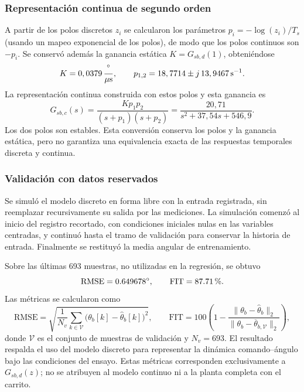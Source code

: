 \documentclass[a4paper, twoside, 10pt, spanish]{article}
\numberwithin{table}{section}
\begin{document}
    \subsubsection{Representación continua de segundo orden}
    A partir de los polos discretos $z_i$ se calcularon los parámetros $p_i=-\log(z_i)/T_s$ (usando un mapeo exponencial de los polos), de modo que los polos continuos son $-p_i$. Se conservó además la ganancia estática $K=G_{sb,d}(1)$, obteniéndose
    \[
        K=0,0379\,\frac{\degree}{\mu\text{s}},\qquad
        p_{1,2}=18,7714 \pm j\,13,9467\,\text{s}^{-1}.
    \]
    La representación continua construida con estos polos y esta ganancia es
    \begin{equation}
        G_{sb,c}(s)=\frac{Kp_1p_2}{(s+p_1)(s+p_2)}
        =\frac{20,71}{s^2+37,54s+546,9}.
        \label{eq:servo_continuo_identificado}
    \end{equation}
    Los dos polos son estables. Esta conversión conserva los polos y la ganancia estática, pero no garantiza una equivalencia exacta de las respuestas temporales discreta y continua.

    \subsubsection{Validación con datos reservados}
    Se simuló el modelo discreto en forma libre con la entrada registrada, sin reemplazar recursivamente su salida por las mediciones. La simulación comenzó al inicio del registro recortado, con condiciones iniciales nulas en las variables centradas, y continuó hasta el tramo de validación para conservar la historia de entrada. Finalmente se restituyó la media angular de entrenamiento.

    Sobre las últimas 693 muestras, no utilizadas en la regresión, se obtuvo
    \[
        \mathrm{RMSE}=0.649678\degree,\qquad \mathrm{FIT}=87.71\,\%.
    \]
    Las métricas se calcularon como
    \[
        \mathrm{RMSE}=\sqrt{\frac{1}{N_v}\sum_{k\in\mathcal V}
        \bigl(\theta_b[k]-\widehat\theta_b[k]\bigr)^2},\qquad
        \mathrm{FIT}=100\left(1-
        \frac{\|\theta_b-\widehat\theta_b\|_2}
        {\|\theta_b-\overline\theta_{b,\mathcal V}\|_2}\right),
    \]
    donde $\mathcal V$ es el conjunto de muestras de validación y $N_v=693$. El resultado respalda el uso del modelo discreto para representar la dinámica comando--ángulo bajo las condiciones del ensayo. Estas métricas corresponden exclusivamente a $G_{sb,d}(z)$; no se atribuyen al modelo continuo ni a la planta completa con el carrito.
\end{document}
